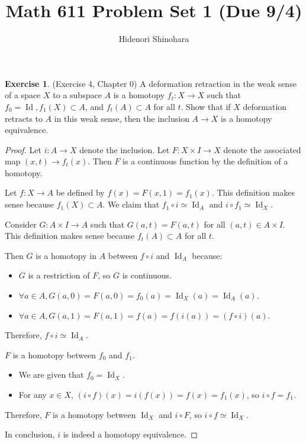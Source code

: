\documentclass[12pt, psamsfonts]{amsart}
\theoremstyle{definition}
\newtheorem{exer}[thm]{Exercise}
\theoremstyle{remark}
\DeclareMathOperator{\Id}{Id}
\numberwithin{equation}{section}
\begin{document}
\title{Math 611 Problem Set 1 (Due 9/4)}
\author{Hidenori Shinohara}
\maketitle

\begin{exer}{(Exercise 4, Chapter 0)}
  A deformation retraction in the weak sense of a space $X$ to a subspace $A$ is a homotopy $f_t: X \rightarrow X$ such that $f_0 = \Id, f_1(X) \subset A$, and $f_t(A) \subset A$ for all $t$.
  Show that if $X$ deformation retracts to $A$ in this weak sense, then the inclusion $A \rightarrow X$ is a homotopy equivalence.
\end{exer}

\begin{proof}
  Let $i: A \rightarrow X$ denote the inclusion.
  Let $F: X \times I \rightarrow X$ denote the associated map $(x, t) \rightarrow f_t(x)$.
  Then $F$ is a continuous function by the definition of a homotopy.

  Let $f: X \rightarrow A$ be defined by $f(x) = F(x, 1) = f_1(x)$.
  This definition makes sense because $f_1(X) \subset A$.
  We claim that $f_1 \circ i \simeq \Id_A$ and $i \circ f_1 \simeq \Id_X$.

  Consider $G: A \times I \rightarrow A$ such that $G(a, t) = F(a, t)$ for all $(a, t) \in A \times I$.
  This definition makes sense because $f_t(A) \subset A$ for all $t$.

  Then $G$ is a homotopy in $A$ between $f \circ i$ and $\Id_A$ because:
  \begin{itemize}
    \item
      $G$ is a restriction of $F$, so $G$ is continuous.
    \item
      $\forall a \in A, G(a, 0) = F(a, 0) = f_0(a) = \Id_X(a) = \Id_A(a)$.
    \item
      $\forall a \in A, G(a, 1) = F(a, 1) = f(a) = f(i(a)) = (f \circ i)(a)$.
  \end{itemize}
  Therefore, $f \circ i \simeq \Id_A$.

  $F$ is a homotopy between $f_0$ and $f_1$.
  \begin{itemize}
    \item
      We are given that $f_0 = \Id_X$.
    \item
      For any $x \in X$, $(i \circ f)(x) = i(f(x)) = f(x) = f_1(x)$, so $i \circ f = f_1$.
  \end{itemize}
  Therefore, $F$ is a homotopy between $\Id_X$ and $i \circ F$, so $i \circ f \simeq \Id_X$.

  In conclusion, $i$ is indeed a homotopy equivalence.
\end{proof}
\end{document}
